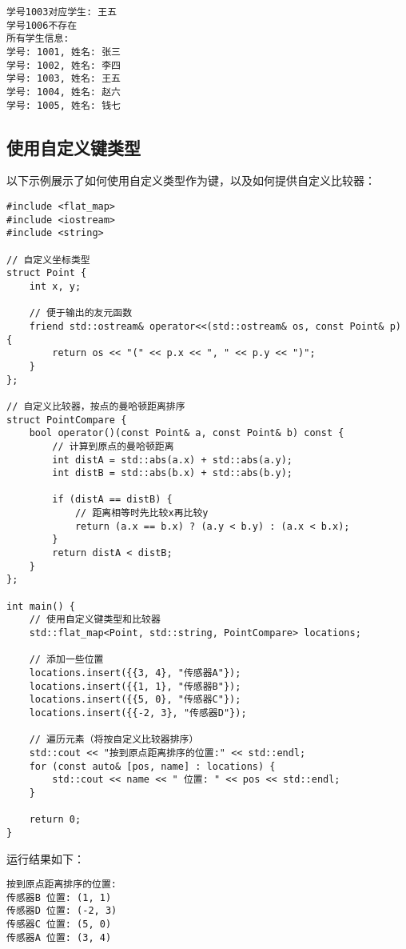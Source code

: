 \documentclass[a4paper, 12pt]{article}
\begin{document}
\begin{lstlisting}[style=cpp]
学号1003对应学生: 王五
学号1006不存在
所有学生信息:
学号: 1001, 姓名: 张三
学号: 1002, 姓名: 李四
学号: 1003, 姓名: 王五
学号: 1004, 姓名: 赵六
学号: 1005, 姓名: 钱七
\end{lstlisting}

\subsection{使用自定义键类型}

以下示例展示了如何使用自定义类型作为键，以及如何提供自定义比较器：

\begin{lstlisting}[style=cpp]
#include <flat_map>
#include <iostream>
#include <string>

// 自定义坐标类型
struct Point {
    int x, y;

    // 便于输出的友元函数
    friend std::ostream& operator<<(std::ostream& os, const Point& p) {
        return os << "(" << p.x << ", " << p.y << ")";
    }
};

// 自定义比较器，按点的曼哈顿距离排序
struct PointCompare {
    bool operator()(const Point& a, const Point& b) const {
        // 计算到原点的曼哈顿距离
        int distA = std::abs(a.x) + std::abs(a.y);
        int distB = std::abs(b.x) + std::abs(b.y);
        
        if (distA == distB) {
            // 距离相等时先比较x再比较y
            return (a.x == b.x) ? (a.y < b.y) : (a.x < b.x);
        }
        return distA < distB;
    }
};

int main() {
    // 使用自定义键类型和比较器
    std::flat_map<Point, std::string, PointCompare> locations;
    
    // 添加一些位置
    locations.insert({{3, 4}, "传感器A"});
    locations.insert({{1, 1}, "传感器B"});
    locations.insert({{5, 0}, "传感器C"});
    locations.insert({{-2, 3}, "传感器D"});
    
    // 遍历元素（将按自定义比较器排序）
    std::cout << "按到原点距离排序的位置:" << std::endl;
    for (const auto& [pos, name] : locations) {
        std::cout << name << " 位置: " << pos << std::endl;
    }
    
    return 0;
}
\end{lstlisting}

运行结果如下：

\begin{lstlisting}[style=cpp]
按到原点距离排序的位置:
传感器B 位置: (1, 1)
传感器D 位置: (-2, 3)
传感器C 位置: (5, 0)
传感器A 位置: (3, 4)
\end{lstlisting}
\end{document}
